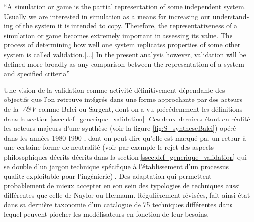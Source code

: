 \foreignquote{english}{A simulation or game is the partial representation of some independent system. Usually we are interested in simulation as a means for increasing our understanding of the system it is intended to copy. Therefore, the representativeness of a simulation or game becomes extremely important in assessing its value. The process of determining how well one system replicates properties of some other system is called validation.[...] In the present analysis however, validation will be defined more broadly as any comparison between the representation of a system and specified criteria} \autocite[216]{Hermann1967}


Une vision de la validation comme activité définitivement dépendante des objectifs que l'on retrouve intégrés dans une forme approchante par des acteurs de la \textit{V\&V} comme Balci ou Sargent, dont on a vu précédemment les définitions dans la section \ref{ssec:def_generique_validation}. Ces deux derniers étant en réalité les acteurs majeurs d'une synthèse (voir la figure \ref{fig:S_syntheseBalci}) opéré dans les années 1980-1990 \autocite{Nance2002}, dont on peut dire qu'elle est marqué par un retour à une certaine forme de neutralité (voir par exemple le rejet des aspects philosophiques décrits décrits dans la section \ref{ssec:def_generique_validation}  qui se double d'un jargon technique spécifique à l'établissement d'un processus qualité exploitable pour l'ingénierie) . Des adaptation qui permettent probablement de mieux accepter en son sein des typologies de techniques aussi différentes que celle de Naylor ou Hermann. Régulièrement révisées, \textcite{Balci1998} fait ainsi état dans sa dernière taxonomie d'un catalogue de 75 techniques différentes dans lequel peuvent piocher les modélisateurs en fonction de leur besoins. 

